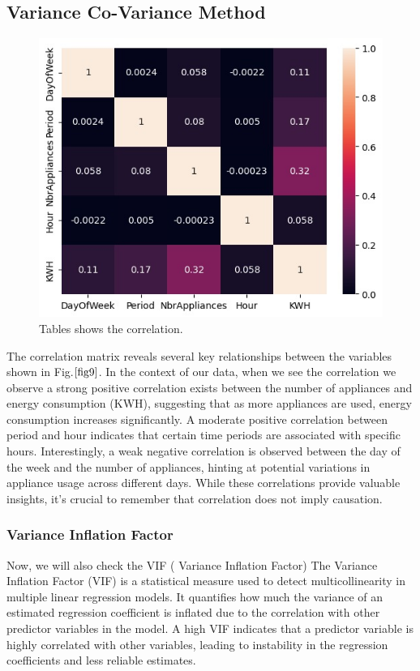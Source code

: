 \documentclass[english,12pt, titlepage]{article}
\begin{document}
	
	\subsection{Variance Co-Variance Method}
	
	\begin{figure}[!ht]
		\centering
		\includegraphics[width=0.6\linewidth]{fig8.jpg}
		\caption{Tables shows the correlation.}\label{fig9}
	\end{figure}
	
	The correlation matrix reveals several key relationships between the variables shown in Fig.$\ref{fig9}$. In the context of our data, when we see the correlation we observe a strong positive correlation exists between the number of appliances and energy consumption (KWH), suggesting that as more appliances are used, energy consumption increases significantly. A moderate positive correlation between period and hour indicates that certain time periods are associated with specific hours. Interestingly, a weak negative correlation is observed between the day of the week and the number of appliances, hinting at potential variations in appliance usage across different days. While these correlations provide valuable insights, it's crucial to remember that correlation does not imply causation.
	
	\subsubsection{Variance Inflation Factor}
	Now, we will also check the VIF ( Variance Inflation Factor)
	The Variance Inflation Factor (VIF) is a statistical measure used to detect multicollinearity in multiple linear regression models. It quantifies how much the variance of an estimated regression coefficient is inflated due to the correlation with other predictor variables in the model. A high VIF indicates that a predictor variable is highly correlated with other variables, leading to instability in the regression coefficients and less reliable estimates.
	
\end{document}

